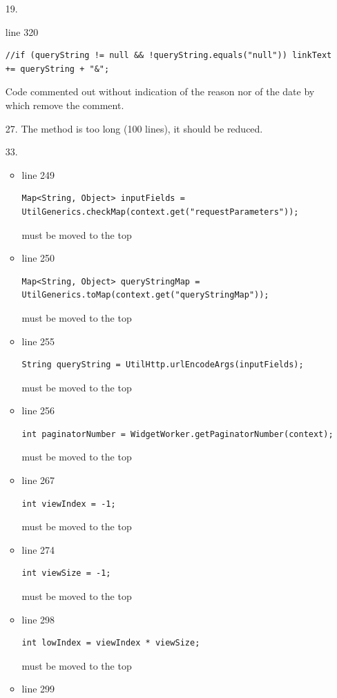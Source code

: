 \documentclass[english]{article}
\begin{document}
\begin{itemize}
\item[19.]{ line 320
		\begin{lstlisting}
//if (queryString != null && !queryString.equals("null")) linkText += queryString + "&";	
		\end{lstlisting}
		Code commented out without indication of the reason nor of the date by which remove the comment.}
		

	\item[27.]{The method is too long (100 lines), it should be reduced.
}	
		\item[33.]{ 
			\begin{itemize}
				\item{line 249
						\begin{lstlisting}
Map<String, Object> inputFields = UtilGenerics.checkMap(context.get("requestParameters"));
						\end{lstlisting} must be moved to the top}
				\item{line 250
						\begin{lstlisting}
Map<String, Object> queryStringMap = UtilGenerics.toMap(context.get("queryStringMap"));
						\end{lstlisting} must be moved to the top}
				\item{line 255
						\begin{lstlisting}
String queryString = UtilHttp.urlEncodeArgs(inputFields);
						\end{lstlisting} must be moved to the top}
				\item{line 256
						\begin{lstlisting}
int paginatorNumber = WidgetWorker.getPaginatorNumber(context);
						\end{lstlisting} must be moved to the top}
				\item{line 267
						\begin{lstlisting}
int viewIndex = -1;
						\end{lstlisting} must be moved to the top}
				\item{line 274
						\begin{lstlisting}
int viewSize = -1;
						\end{lstlisting} must be moved to the top}
				\item{line 298
						\begin{lstlisting}
int lowIndex = viewIndex * viewSize;
						\end{lstlisting} must be moved to the top}
				\item{line 299
						\begin{lstlisting}

\end{lstlisting}}
\end{itemize}}
\end{itemize}
\end{document}
